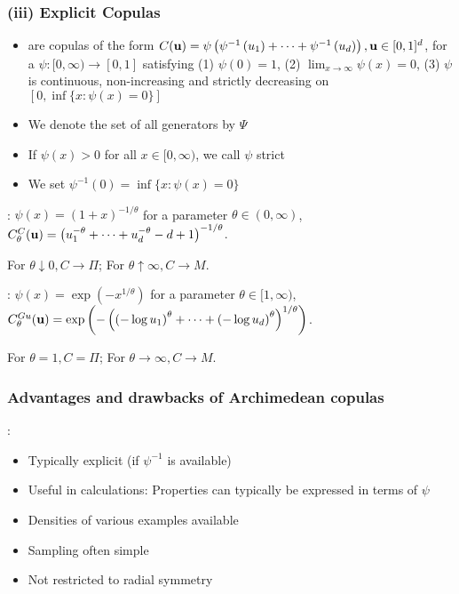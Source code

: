 \subsubsection*{(iii) Explicit Copulas}
\begin{itemize}[leftmargin=*]
    \item {} are copulas of the form
$
C(\operatorname{\boldsymbol{\mathbf{u}}})=\psi\left(\psi^{-1}\left(u_{1}\right)+\cdots+\psi^{-1}\left(u_{d}\right)\right), \operatorname{\boldsymbol{\mathbf{u}}} \in[0,1]^{d}
$, for a  $\psi:[0, \infty) \rightarrow[0,1]$ satisfying (1) $\psi(0)=1$, (2) $\lim _{x \rightarrow \infty} \psi(x)=0$, (3) $\psi$ is continuous, non-increasing and strictly decreasing on $[0, \inf \{x: \psi(x)=0\}]$
    \item We denote the set of all generators by $\Psi$
    \item If $\psi(x)>0$ for all $x \in[0, \infty)$, we call $\psi$ strict
    \item We set $\psi^{-1}(0)=\inf \{x: \psi(x)=0\}$
\end{itemize}


: $\psi(x)=(1+x)^{-1 / \theta}$ for a parameter $\theta \in(0, \infty)$, 
$
C_{\theta}^{C}(\operatorname{\boldsymbol{\mathbf{u}}})=\left(u_{1}^{-\theta}+\cdots+u_{d}^{-\theta}-d+1\right)^{-1 / \theta}
$. 

For $\theta \downarrow 0, C \rightarrow \Pi$; For $\theta \uparrow \infty, C \rightarrow M$.

: $\psi(x)=\exp \left(-x^{1 / \theta}\right)$ for a parameter $\theta \in[1, \infty)$, $
C_{\theta}^{G u}(\operatorname{\boldsymbol{\mathbf{u}}})=\exp \left(-\left(\left(-\log u_{1}\right)^{\theta}+\cdots+\left(-\log u_{d}\right)^{\theta}\right)^{1 / \theta}\right)
$. 

For $\theta=1, C=\Pi$; For $\theta \rightarrow \infty, C \rightarrow M$.






\subsubsection*{Advantages and drawbacks of Archimedean copulas}
:
\begin{itemize}[leftmargin=*]
    \item Typically explicit (if $\psi^{-1}$ is available)
    \item Useful in calculations: Properties can typically be expressed in terms of $\psi$
    \item Densities of various examples available
    \item Sampling often simple
    \item Not restricted to radial symmetry
\end{itemize}

